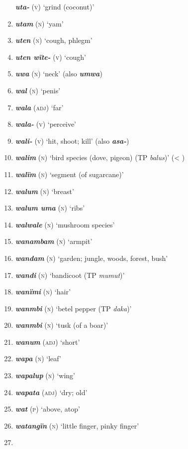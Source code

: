\begin{enumerate}[noitemsep, label={}, align=left, widest=190, labelsep=1ex,leftmargin=*,itemindent=-10pt]
\textbf{\textit{uta-}} (\textsc{v}) ‘grind (coconut)’ \item
\textbf{\textit{utam}} (\textsc{n}) ‘yam’ \item
\textbf{\textit{uten}} (\textsc{n}) ‘cough, phlegm’ \item
\textbf{\textit{uten wïte-}} (\textsc{v}) ‘cough’ \item
\textbf{\textit{uwa}} (\textsc{n}) ‘neck’ (also \textbf{\textit{umwa}}) \item
\textbf{\textit{wal}} (\textsc{n}) ‘penis’ \item
\textbf{\textit{wala}} (\textsc{adj}) ‘far’ \item
\textbf{\textit{wala-}} (\textsc{v}) ‘perceive’ \item
\textbf{\textit{wali-}} (\textsc{v}) ‘hit, shoot; kill’ (also \textbf{\textit{asa-}}) \item
\textbf{\textit{walim}} (\textsc{n}) ‘bird species (dove, pigeon) (TP \textit{balus})’ (< ) \item
\textbf{\textit{walïm}} (\textsc{n}) ‘segment (of sugarcane)’ \item
\textbf{\textit{walum}} (\textsc{n}) ‘breast’ \item
\textbf{\textit{walum uma}} (\textsc{n}) ‘ribs’ \item
\textbf{\textit{walwale}} (\textsc{n}) ‘mushroom species’ \item
\textbf{\textit{wanambam}} (\textsc{n}) ‘armpit’ \item
\textbf{\textit{wandam}} (\textsc{n}) ‘garden; jungle, woods, forest, bush’ \item
\textbf{\textit{wandi}} (\textsc{n}) ‘bandicoot (TP \textit{mumut})’ \item
\textbf{\textit{wanïmi}} (\textsc{n}) ‘hair’ \item
\textbf{\textit{wanmbi}} (\textsc{n}) ‘betel pepper (TP \textit{daka})’ \item
\textbf{\textit{wanmbi}} (\textsc{n}) ‘tusk (of a boar)’ \item
\textbf{\textit{wanum}} (\textsc{adj)} ‘short’ \item
\textbf{\textit{wapa}} (\textsc{n}) ‘leaf’ \item
\textbf{\textit{wapalup}} (\textsc{n}) ‘wing’ \item
\textbf{\textit{wapata}} (\textsc{adj}) ‘dry; old’ \item
\textbf{\textit{wat} }(\textsc{p)} ‘above, atop’ \item
\textbf{\textit{watangïn}} (\textsc{n}) ‘little finger, pinky finger’ \item

\end{enumerate}

